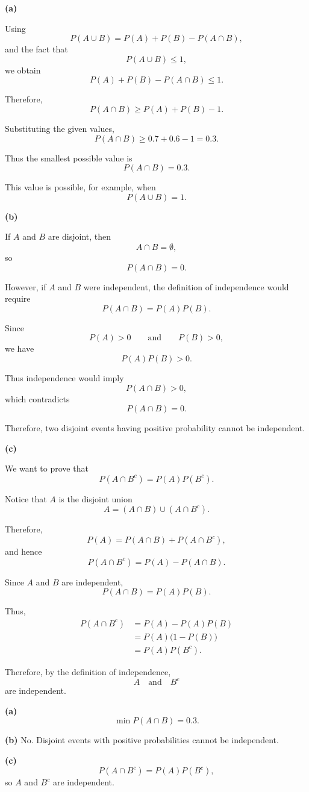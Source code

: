 \documentclass[11pt]{article}
\begin{document}
\begin{solutionbox}

\textbf{(a)}

Using
\[
P(A\cup B)
=
P(A)+P(B)-P(A\cap B),
\]
and the fact that
\[
P(A\cup B)\leq 1,
\]
we obtain
\[
P(A)+P(B)-P(A\cap B)\leq1.
\]

Therefore,
\[
P(A\cap B)
\geq
P(A)+P(B)-1.
\]

Substituting the given values,
\[
P(A\cap B)
\geq
0.7+0.6-1
=
0.3.
\]

Thus the smallest possible value is
\[
P(A\cap B)=0.3.
\]

This value is possible, for example, when
\[
P(A\cup B)=1.
\]


\textbf{(b)}

If $A$ and $B$ are disjoint, then
\[
A\cap B=\emptyset,
\]
so
\[
P(A\cap B)=0.
\]

However, if $A$ and $B$ were independent, the definition of independence
would require
\[
P(A\cap B)
=
P(A)P(B).
\]

Since
\[
P(A)>0
\qquad\text{and}\qquad
P(B)>0,
\]
we have
\[
P(A)P(B)>0.
\]

Thus independence would imply
\[
P(A\cap B)>0,
\]
which contradicts
\[
P(A\cap B)=0.
\]

Therefore, two disjoint events having positive probability cannot be
independent.


\textbf{(c)}

We want to prove that
\[
P(A\cap B^c)
=
P(A)P(B^c).
\]

Notice that $A$ is the disjoint union
\[
A
=
(A\cap B)\cup(A\cap B^c).
\]

Therefore,
\[
P(A)
=
P(A\cap B)+P(A\cap B^c),
\]
and hence
\[
P(A\cap B^c)
=
P(A)-P(A\cap B).
\]

Since $A$ and $B$ are independent,
\[
P(A\cap B)=P(A)P(B).
\]

Thus,
\begin{align*}
P(A\cap B^c)
&=
P(A)-P(A)P(B)\\
&=
P(A)\bigl(1-P(B)\bigr)\\
&=
P(A)P(B^c).
\end{align*}

Therefore, by the definition of independence,
\[
A\quad\text{and}\quad B^c
\]
are independent.

\begin{finalanswerbox}

\textbf{(a)}
\[
\min P(A\cap B)=0.3.
\]

\textbf{(b)} No. Disjoint events with positive probabilities cannot be
independent.

\textbf{(c)}
\[
P(A\cap B^c)=P(A)P(B^c),
\]
so $A$ and $B^c$ are independent.

\end{finalanswerbox}

\end{solutionbox}
\end{document}
